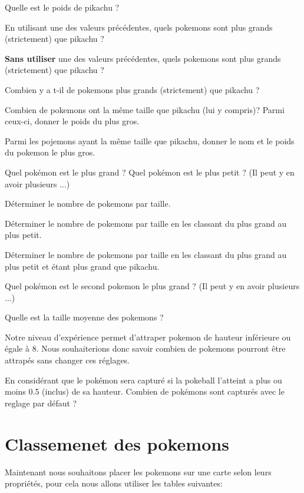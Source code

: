 \question{}
Quelle est le poids de pikachu ?

\question{}
En utilisant une des valeurs précédentes, quels pokemons sont plus grands (strictement) que pikachu ?


\question{}
\textbf{Sans utiliser} une des valeurs précédentes, quels pokemons sont plus grands (strictement) que pikachu ?


\question{}
Combien y a t-il de pokemons plus grands (strictement) que pikachu ?


\question{}
Combien de pokemons ont la même taille que pikachu (lui y compris)? Parmi ceux-ci, donner le poids du plus gros.

\question{}
Parmi les pojemons ayant la même taille que pikachu, donner le nom et le poids du pokemon le plus gros.

\question{}
Quel pokémon est le plus grand ? Quel pokémon est le plus petit ? (Il peut y en avoir plusieurs ...)

\question{}
Déterminer le nombre de pokemons par taille. 

\question{}
Déterminer le nombre de pokemons par taille en les classant du plus grand au plus petit. 


\question{}
Déterminer le nombre de pokemons par taille en les classant du plus grand au plus petit et étant plus grand que pikachu.


\question{}
Quel pokémon est le second pokemon le plus grand ? (Il peut y en avoir plusieurs ...)


\question{}
Quelle est la taille moyenne des pokemons ?



Notre niveau d'expérience permet d'attraper pokemon de hauteur inférieure ou égale à 8. 
Nous souhaiterions donc savoir combien de pokemons pourront être attrapés sans changer ces réglages.

\question{}
En considérant que le pokémon sera capturé si la pokeball l'atteint a plus ou moins 0.5 (inclus) de sa hauteur. Combien de pokémons sont capturés avec le reglage par défaut ?

\section*{Classemenet des pokemons}
Maintenant nous souhaitons placer les pokemons sur une carte selon leurs propriétés, pour cela nous allons utiliser les tables suivantes:


